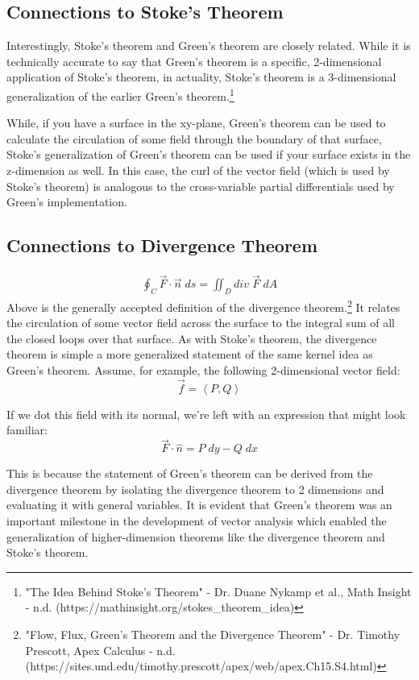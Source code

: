 \documentclass[11pt,English]{article}
\begin{document}
\subsection{Connections to Stoke's Theorem}
Interestingly, Stoke's theorem and Green's theorem are closely related. While it is technically accurate to say that Green's theorem is a specific, 2-dimensional application of Stoke's theorem, in actuality, Stoke's theorem is a 3-dimensional generalization of the earlier Green's theorem.\footnote{"The Idea Behind Stoke's Theorem" - Dr. Duane Nykamp et al., Math Insight - n.d. (https://mathinsight.org/stokes\_theorem\_idea)}

While, if you have a surface in the xy-plane, Green's theorem can be used to calculate the circulation of some field through the boundary of that surface, Stoke's generalization of Green's theorem can be used if your surface exists in the z-dimension as well. In this case, the curl of the vector field (which is used by Stoke's theorem) is analogous to the cross-variable partial differentials used by Green's implementation.

\subsection{Connections to Divergence Theorem}
\begin{align*}
    \oint_C \vec{F} \cdot \vec{n} \; ds = \iint_D div \; \vec{F} \; dA
\end{align*}
Above is the generally accepted definition of the divergence theorem.\footnote{"Flow, Flux, Green’s Theorem and the Divergence Theorem" - Dr. Timothy Prescott, Apex Calculus - n.d. (https://sites.und.edu/timothy.prescott/apex/web/apex.Ch15.S4.html)} It relates the circulation of some vector field across the surface to the integral sum of all the closed loops over that surface. As with Stoke's theorem, the divergence theorem is simple a more generalized statement of the same kernel idea as Green's theorem. Assume, for example, the following 2-dimensional vector field:
$$
\vec{f} = \left<P,Q\right>
$$

If we dot this field with its normal, we're left with an expression that might look familiar:
$$
\vec{F} \cdot \hat{n} = P \; dy - Q \; dx
$$

This is because the statement of Green's theorem can be derived from the divergence theorem by isolating the divergence theorem to 2 dimensions and evaluating it with general variables. It is evident that Green's theorem was an important milestone in the development of vector analysis which enabled the generalization of higher-dimension theorems like the divergence theorem and Stoke's theorem.
\end{document}
